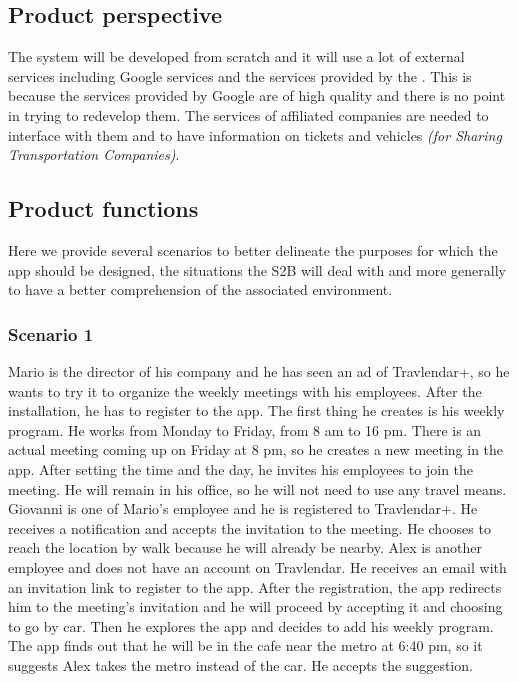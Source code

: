 \subsection{Product perspective}
	The system will be developed from scratch and it will use a lot of external services including Google services and the services provided by the . This is because the services provided by Google are of high quality and there is no point in trying to redevelop them. The services of affiliated companies are needed to interface with them and to have information on tickets and vehicles \textit{(for Sharing Transportation Companies)}.
\subsection{Product functions}
Here we provide several scenarios to better delineate the purposes for which the app should be designed, the situations the S2B will deal with and more generally to have a better comprehension of the associated environment.

	\subsubsection{Scenario 1}
	Mario is the director of his company and he has seen an ad of Travlendar+, so he wants to try it to organize the weekly meetings with his employees. After the installation, he has to register to the app. The first thing he creates is his weekly program. He works from Monday to Friday, from 8 am to 16 pm.\newline
	There is an actual meeting coming up on Friday at 8 pm, so he creates a new	meeting in the app. After setting the time and the day, he invites his employees to join the meeting. He will remain in his office, so he will not need to use	any travel means.\newline
	Giovanni is one of Mario's employee and he is registered to Travlendar+. He receives a notification and accepts the invitation to the meeting. He chooses to reach the location by walk because he will already be nearby.\newline
	Alex is another employee and does not have an account on Travlendar. He receives an email with an invitation link to register to the app. After the registration, the app redirects him to the meeting's invitation and he will proceed by accepting it and choosing to go by car. Then he explores the app and decides to add his weekly program. The app finds out that he will be in the cafe near the metro at 6:40 pm, so it suggests Alex takes the metro instead of the car. He accepts the suggestion.

